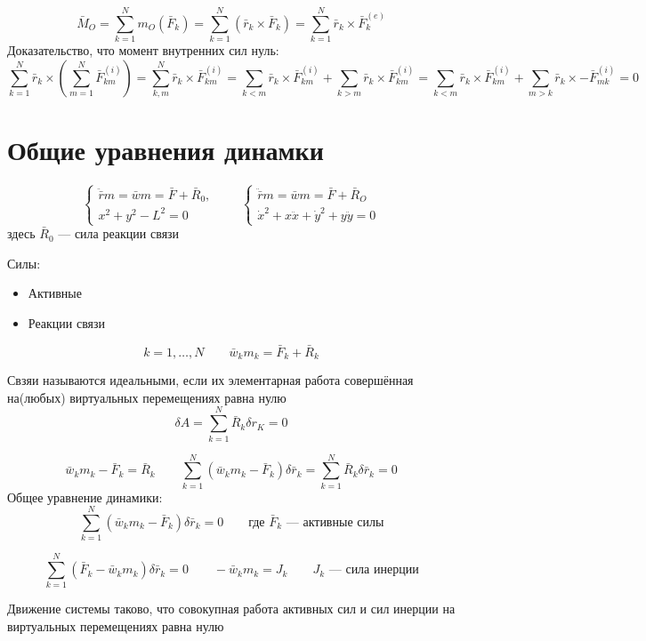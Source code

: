 \documentclass[crop=false]{standalone}
\begin{document}
\begin{enumerate}
    \keypoint
    \[\bar M_O = \sum_{k=1}^{N} m_O(\bar F_k) = \sum_{k=1}^{N} (\bar r_k \times \bar F_k) = \sum_{k=1}^{N} \bar r_k \times \bar F_k^{(e)} \]
    Доказательство, что момент внутренних сил нуль:
    \[\sum_{k=1}^{N} \bar r_k \times \left( \sum_{m=1}^{N} \bar F_{k m}^{(i)} \right) = 
    \sum_{k, m}^{N} \bar r_k \times \bar F_{k m}^{(i)} 
    = \sum_{k < m} \bar r_k \times \bar F_{k m}^{(i)} + \sum_{k > m} \bar r_k \times \bar F_{k m}^{(i)} 
    = \sum_{k < m} \bar r_k \times \bar F_{k m}^{(i)} + \sum_{m > k} \bar r_k \times -\bar F_{m k}^{(i)} = 0
    \] %
\end{enumerate}
\section{Общие уравнения динамки}

\[\begin{cases}
    \ddot{\bar r} m = \bar w m = \bar F + \bar R_0, \\
    x^2 + y^2 - L^2 = 0
\end{cases} \qquad \begin{cases}
    \ddot{\bar r} m = \bar w m = \bar F + \bar R_O\\
    \dot x^2 + x \ddot x + \dot y^2 + y \ddot y = 0
\end{cases}\]
здесь $\bar R_0$ — сила реакции связи

Силы:
\begin{itemize}
    \item Активные
    \item Реакции связи
\end{itemize}

\[k = 1, \dots, N \qquad \bar w_k m_k = \bar F_k + \bar R_k\]

\Def Свзяи называются идеальными, если их элементарная работа совершённая на(любых) виртуальных перемещениях равна нулю
\[\delta A =\sum_{k=1}^{N}\bar R_k \delta r_K = 0\]

\[\bar w_k m_k - \bar F_k = \bar R_k \qquad \sum_{k=1}^{N} (\bar w_k m_k - \bar F_k) \delta \bar r_k = \sum_{k=1}^{N} \bar R_k \delta \bar r_k = 0\]
Общее уравнение динамики: 
\[\boxed{\sum_{k=1}^{N} (\bar w_k m_k - \bar F_k) \delta \bar r_k = 0} \qquad \text{где }\bar F_k\text{ — активные силы}\]

\[\sum_{k=1}^{N} (\bar F_k - \bar w_k m_k) \delta \bar r_k = 0 \qquad -\bar w_k m_k = J_k \qquad J_k \text{ — сила инерции}\]

Движение системы таково, что совокупная работа активных сил и сил инерции на виртуальных перемещениях равна нулю
\end{document}
